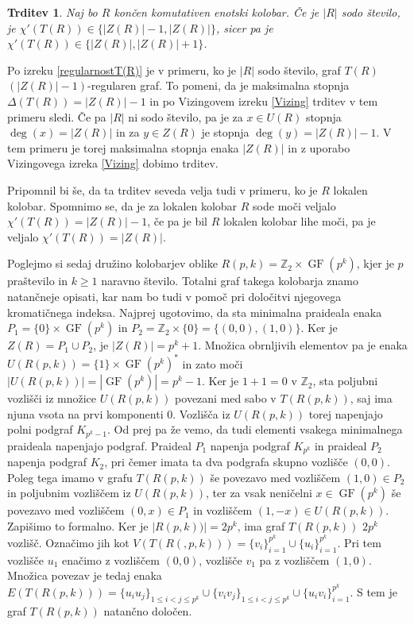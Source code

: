 \documentclass[a4paper, 12pt]{amsart}
\theoremstyle{definition} %
\theoremstyle{plain} %
\newtheorem{trditev}[definicija]{Trditev}
\newcommand{\Z}{\mathbb Z}
\DeclareMathOperator{\GF}{GF}
\begin{document}
\begin{trditev}
Naj bo $R$ končen komutativen enotski kolobar.  Če je $|R|$ sodo število, je $\chi'(T(R)) \in\{|Z(R)|-1, |Z(R)|\}$, sicer pa je $\chi'(T(R)) \in \{|Z(R)|, |Z(R)| +1\}$.
\end{trditev}

\proof
Po izreku \ref{regularnostT(R)} je v primeru, ko je $|R|$ sodo število, graf $T(R)$ $(|Z(R)| - 1)$-regularen graf. To pomeni, da je maksimalna stopnja $\Delta(T(R)) = |Z(R)|-1$ in po Vizingovem izreku \ref{Vizing} trditev v tem primeru sledi. Če pa $|R|$ ni sodo število, pa je za $x\in U(R)$ stopnja $\deg(x) = |Z(R)|$ in za $y \in Z(R)$ je stopnja $\deg(y) = |Z(R)| - 1$. V tem primeru je torej maksimalna stopnja enaka $|Z(R)|$ in z uporabo Vizingovega izreka \ref{Vizing} dobimo trditev.
\endproof

Pripomnil bi še, da ta trditev seveda velja tudi v primeru, ko je $R$ lokalen kolobar. Spomnimo se, da je za lokalen kolobar $R$ sode moči veljalo $\chi'(T(R)) = |Z(R)| -1$, če pa je bil $R$ lokalen kolobar lihe moči, pa je veljalo $\chi'(T(R)) = |Z(R)|$.

Poglejmo si sedaj družino kolobarjev oblike $R(p,k) = \Z_2 \times \GF(p^k)$, kjer je $p$ praštevilo in $k\ge1$ naravno število. Totalni graf takega kolobarja znamo natančneje opisati, kar nam bo tudi v pomoč pri določitvi njegovega kromatičnega indeksa. Najprej ugotovimo, da sta minimalna praideala enaka $P_1= \{0\} \times \GF(p^k)$ in $P_2 = \Z_2 \times \{0\} = \{(0,0),(1,0)\}$. Ker je $Z(R) = P_1 \cup P_2$, je $|Z(R)| = p^k + 1$. Množica obrnljivih elementov pa je enaka $U(R(p,k)) = \{1\} \times \GF(p^k)^*$ in zato moči $|U(R(p,k))| = |\GF(p^k)| = p^k - 1$. Ker je $1+1=0$ v $\Z_2$, sta poljubni vozlišči iz množice $U(R(p,k))$ povezani med sabo v $T(R(p,k))$, saj ima njuna vsota na prvi komponenti 0. Vozlišča iz $U(R(p,k))$ torej napenjajo polni podgraf $K_{p^k -1}$. Od prej pa že vemo, da tudi elementi vsakega minimalnega praideala napenjajo podgraf. Praideal $P_1$ napenja podgraf $K_{p^k}$ in praideal $P_2$ napenja podgraf $K_2$, pri čemer imata ta dva podgrafa skupno vozlišče $(0,0)$. Poleg tega imamo v grafu $T(R(p,k))$ še povezavo med vozliščem $(1,0)\in P_2$ in poljubnim vozliščem iz $U(R(p,k))$, ter za vsak neničelni $x\in \GF(p^k)$ še  povezavo med vozliščem $(0,x)\in P_1$ in vozliščem $(1,-x)\in U(R(p,k))$. Zapišimo to formalno. Ker je $|R(p,k))| = 2p^k$, ima graf $T(R(p,k))$ $2p^k$ vozlišč. Označimo jih kot $V(T(R(,p,k))) = \{v_i\}_{i=1}^{p^k} \cup \{u_i\}_{i=1}^{p^k}$. Pri tem vozlišče $u_1$ enačimo z vozliščem $(0,0)$, vozlišče $v_1$ pa z vozliščem $(1,0)$. Množica povezav je tedaj enaka $E(T(R(p,k))) = \{u_i u_j\}_{1\le i < j \le p^k} \cup \{v_i v_j\}_{1\le i < j \le p^k} \cup \{u_i v_i\}_{i=1}^{p^k}$. S tem je graf $T(R(p,k))$ natančno določen.
\end{document}
